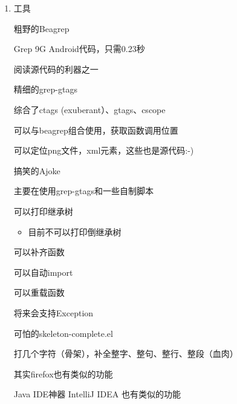 \documentclass[presentation,dvipdfmx,CJKbookmarks]{beamer}
\begin{document}
\begin{CJK*}{UTF8}{simsun}
\begin{enumerate}
\begin{frame}[label={sec:org3cb7c42}]{往期回顾}
\begin{block}{Android系统和环境}
\end{block}
\begin{block}{Activity等四大组件}
\end{block}
\begin{block}{ListView}
\end{block}
\end{frame}
\item 工具
\label{sec:org14d2916}
\begin{frame}[label={sec:org87b6b9c}]{粗野的Beagrep}
\begin{block}{Grep 9G Android代码，只需0.23秒}
\end{block}
\begin{block}{阅读源代码的利器之一}
\end{block}
\end{frame}
\begin{frame}[label={sec:org8f0836b}]{精细的grep-gtags}
\begin{block}{综合了ctags (exuberant）、gtags、cscope}
\end{block}
\begin{block}{可以与beagrep组合使用，获取函数调用位置}
\end{block}
\begin{block}{可以定位png文件，xml元素，这些也是源代码:-)}
\end{block}
\end{frame}
\begin{frame}[label={sec:org0a671af}]{搞笑的Ajoke}
\begin{block}{主要在使用grep-gtags和一些自制脚本}
\end{block}
\begin{block}{可以打印继承树}
\begin{itemize}
\item 目前不可以打印倒继承树
\end{itemize}
\end{block}
\begin{block}{可以补齐函数}
\end{block}
\begin{block}{可以自动import}
\end{block}
\begin{block}{可以重载函数}
\end{block}
\begin{block}{将来会支持Exception}
\end{block}
\end{frame}
\begin{frame}[label={sec:org3764a63}]{可怕的skeleton-complete.el}
\begin{block}{打几个字符（骨架），补全整字、整句、整行、整段（血肉）}
\end{block}
\begin{block}{其实firefox也有类似的功能}
\end{block}
\begin{block}{Java IDE神器 IntelliJ IDEA 也有类似的功能}
\end{block}
\end{frame}


\end{enumerate}
\end{CJK*}
\end{document}
